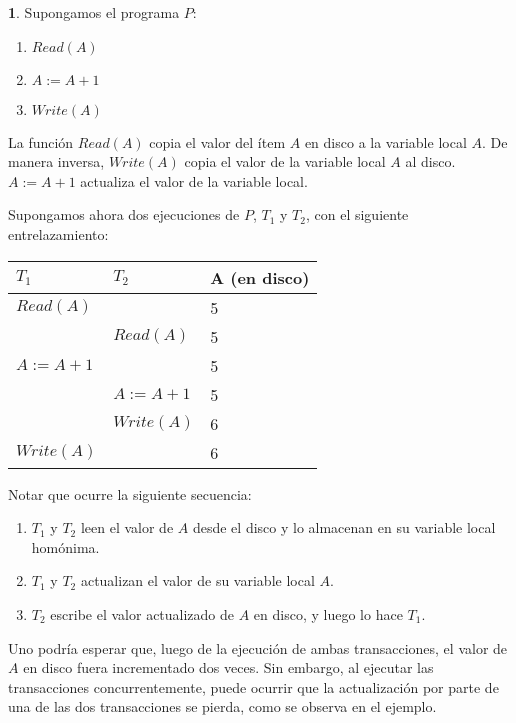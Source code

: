 \documentclass[english,titlepage]{article}
\theoremstyle{definition}
\theoremstyle{definition}
\newtheorem{example}[thm]{\protect\examplename}
\providecommand{\examplename}{Ejemplo}
\begin{document}
\begin{example}
Supongamos el programa $P$:
\begin{enumerate}
    \item $Read(A)$
    \item $A := A + 1$
    \item $Write(A)$
\end{enumerate}

La función $Read(A)$ copia el valor del ítem $A$ en disco a la variable local
$A$. De manera inversa, $Write(A)$ copia el valor de la variable local $A$ al
disco. $A := A + 1$ actualiza el valor de la variable local.

Supongamos ahora dos ejecuciones de $P$, $T_1$ y $T_2$, con el siguiente
entrelazamiento:

\vspace{10pt}

\begin{tabular}{ l l l }
  $T_1$         & $T_2$         & A (en disco)  \\
  \hline
  $Read(A)$     &               & 5             \\
                & $Read(A)$     & 5             \\
  $A := A + 1$  &               & 5             \\
                & $A := A + 1$  & 5             \\
                & $Write(A)$    & 6             \\
  $Write(A)$    &               & 6             \\
\end{tabular}

\vspace{10pt}

Notar que ocurre la siguiente secuencia:
\begin{enumerate}
    \item $T_1$ y $T_2$ leen el valor de $A$ desde el disco y lo almacenan en
        su variable local homónima.
    \item $T_1$ y $T_2$ actualizan el valor de su variable local $A$.
    \item $T_2$ escribe el valor actualizado de $A$ en disco, y luego lo hace
        $T_1$.
\end{enumerate}

Uno podría esperar que, luego de la ejecución de ambas transacciones, el valor
de $A$ en disco fuera incrementado dos veces. Sin embargo, al ejecutar las
transacciones concurrentemente, puede ocurrir que la actualización por parte
de una de las dos transacciones se pierda, como se observa en el ejemplo.
\end{example}
\end{document}
